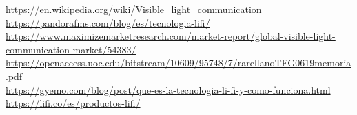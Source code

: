 
 \url{https://en.wikipedia.org/wiki/Visible_light_communication}
 \\
 \url{https://pandorafms.com/blog/es/tecnologia-lifi/}
 \\
 \url{https://www.maximizemarketresearch.com/market-report/global-visible-light-communication-market/54383/}
 \\
 \url{https://openaccess.uoc.edu/bitstream/10609/95748/7/rarellanoTFG0619memoria.pdf}
 \\
\url{https://gyemo.com/blog/post/que-es-la-tecnologia-li-fi-y-como-funciona.html}
\\
\url{https://lifi.co/es/productos-lifi/}